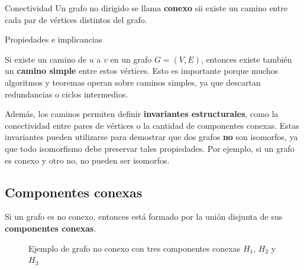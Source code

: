 \begin{definitionblock}{Conectividad}
Un grafo no dirigido se llama \textbf{conexo} sii existe un camino entre cada par de vértices distintos del grafo.
\end{definitionblock}

\begin{paragraph}{Propiedades e implicancias}
\leavevmode

Si existe un camino de $u$ a $v$ en un grafo $G = (V,E)$, entonces existe también un \textbf{camino simple} entre estos vértices. Esto es importante porque muchos algoritmos y teoremas operan sobre caminos simples, ya que descartan redundancias o ciclos intermedios.

Además, los caminos permiten definir \textbf{invariantes estructurales}, como la conectividad entre pares de vértices o la cantidad de componentes conexas. Estas invariantes pueden utilizarse para demostrar que dos grafos \textbf{no} son isomorfos, ya que todo isomorfismo debe preservar tales propiedades. Por ejemplo, si un grafo es conexo y otro no, no pueden ser isomorfos.
\end{paragraph}


\subsection{Componentes conexas}

Si un grafo es no conexo, entonces está formado por la unión disjunta de sus \textbf{componentes conexas}.

\begin{figure}[h]
  \centering
  \caption{Ejemplo de grafo no conexo con tres componentes conexas $H_1$, $H_2$ y $H_3$}
\end{figure}



